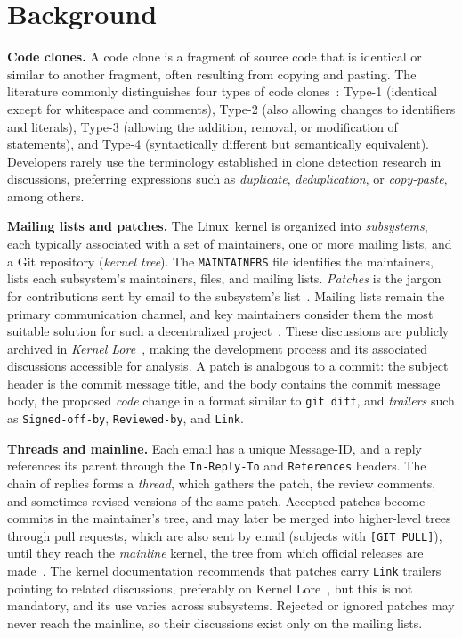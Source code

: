 \documentclass[10pt,conference]{IEEEtran}
\begin{document}
\section{Background}\label{sec:background}

\textbf{Code clones.} A code clone is a fragment of source code that is identical or similar to another fragment, often resulting from copying and pasting. The literature commonly distinguishes four types of code clones~\cite{roy2009comparison}: Type-1 (identical except for whitespace and comments), Type-2 (also allowing changes to identifiers and literals), Type-3 (allowing the addition, removal, or modification of statements), and Type-4 (syntactically different but semantically equivalent). Developers rarely use the terminology established in clone detection research in discussions, preferring expressions such as \textit{duplicate}, \textit{deduplication}, or \textit{copy-paste}, among others.

\textbf{Mailing lists and patches.} The \mbox{Linux kernel} is organized into \emph{subsystems}, each typically associated with a set of maintainers, one or more mailing lists, and a Git repository (\emph{kernel tree}). The \texttt{MAINTAINERS} file identifies the maintainers, lists each subsystem's maintainers, files, and mailing lists. \emph{Patches} is the jargon for contributions sent by email to the subsystem's list~\cite{kernelMailingListsDoc}. Mailing lists remain the primary communication channel, and key maintainers consider them the most suitable solution for such a decentralized project~\cite{kernelEmailUsage}. These discussions are publicly archived in \emph{Kernel Lore}~\cite{kernelLore}, making the development process and its associated discussions accessible for analysis. A patch is analogous to a commit: the subject header is the commit message title, and the body contains the commit message body, the proposed \emph{code} change in a format similar to \texttt{git diff}, and \emph{trailers} such as \texttt{Signed-off-by}, \texttt{Reviewed-by}, and \texttt{Link}.

\textbf{Threads and mainline.} Each email has a unique Message-ID, and a reply references its parent through the \texttt{In-Reply-To} and \texttt{References} headers. The chain of replies forms a \emph{thread}, which gathers the patch, the review comments, and sometimes revised versions of the same patch. Accepted patches become commits in the maintainer's tree, and may later be merged into higher-level trees through pull requests, which are also sent by email (subjects with \texttt{[GIT PULL]}), until they reach the \emph{mainline} kernel, the tree from which official releases are made~\cite{jiang2013patch}. The kernel documentation recommends that patches carry \texttt{Link} trailers pointing to related discussions, preferably on Kernel Lore~\cite{kernelMailingListsDoc}, but this is not mandatory, and its use varies across subsystems. Rejected or ignored patches may never reach the mainline, so their discussions exist only on the mailing lists.
\end{document}
